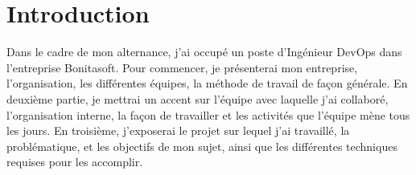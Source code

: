 \documentclass[12pt]{article}
\begin{document}
\newpage
\setcounter{tocdepth}{2}
\tableofcontents
\newpage

\section{Introduction}
Dans le cadre de mon alternance, j'ai occupé un poste d'Ingénieur DevOps dans
l'entreprise Bonitasoft.
Pour commencer, je présenterai mon entreprise, l'organisation, les différentes équipes,
la méthode de travail de façon générale.
En deuxième partie, je mettrai un accent sur l'équipe avec laquelle j'ai collaboré,
l'organisation interne, la façon de travailler et les activités que l'équipe
mène tous les jours.
En troisième, j'exposerai le projet sur lequel j'ai travaillé, la problématique,
et les objectifs de mon sujet, ainsi que les différentes techniques requises pour
les accomplir.










\newpage
{}
\newpage



\end{document}
